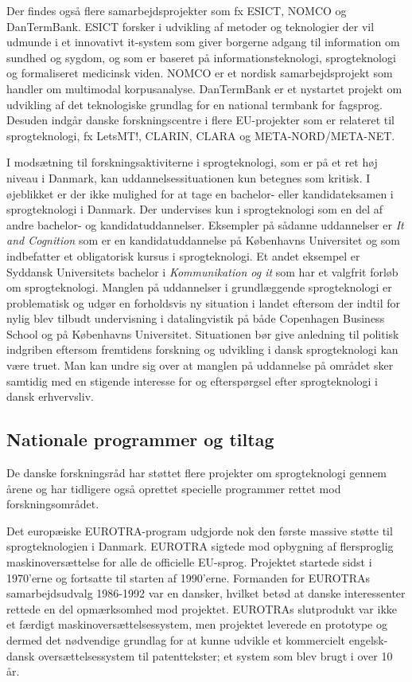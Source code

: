\begin{multicols}{2}
Der findes \mbox{ogs\aa} flere samarbejdsprojekter som fx ESICT, NOMCO og DanTermBank. ESICT forsker i udvikling af metoder og teknologier der vil udmunde i et innovativt it-system som giver borgerne adgang til information om sundhed og sygdom, og som er baseret \mbox{p\aa} informationsteknologi, sprogteknologi og formaliseret medicinsk viden. NOMCO er et nordisk samarbejdsprojekt som handler om multimodal korpusanalyse. DanTermBank er et nystartet projekt om udvikling af det teknologiske grundlag for en national termbank for fag\-sprog. Desuden indg\aa r danske forskningscentre i flere EU-projekter som er relateret til sprogteknologi, fx LetsMT!, CLARIN, CLARA og META-NORD/META-NET.

I mods\ae tning til forskningsaktiviterne i sprogteknologi, som er \mbox{p\aa} et ret h\o j niveau i Danmark, kan uddannelsessituationen kun betegnes som kritisk. I \o jeblikket er der ikke mulighed for at tage en bachelor- eller kandidateksamen i sprogteknologi i Danmark.  Der undervises kun i sprogteknologi som en del af andre bachelor- og kandidatuddannelser. Eksempler \mbox{p\aa} s\aa danne uddannelser er {\it It and Cognition} som er en kandidatuddannelse \mbox{p\aa} K\o benhavns Universitet og som indbefatter et obligatorisk kursus i sprogteknologi. Et andet eksempel er Syddansk Universitets bachelor i {\it Kommunikation og it} som har et valgfrit forl\o b om sprogteknologi. Manglen \mbox{p\aa} uddannelser i grundl\ae ggende sprogteknologi er problematisk og udg\o r en forholdsvis ny situation i landet eftersom der indtil for nylig blev tilbudt undervisning i datalingvistik \mbox{p\aa} b\aa de Copenhagen Business School og \mbox{p\aa} K\o benhavns Universitet. Situationen b\o r give anledning til politisk indgriben eftersom fremtidens forskning og udvikling i dansk sprogteknologi kan v\ae re truet. Man kan undre sig over at manglen \mbox{p\aa} uddannelse \mbox{p\aa} omr\aa det sker samtidig med en stigende interesse for og eftersp\o rgsel efter sprogteknologi i dansk erhvervsliv.

\subsection{Nationale programmer og tiltag}

De danske forskningsr\aa d har st\o ttet flere projekter om sprogteknologi gennem \aa rene og har tidligere \mbox{ogs\aa} oprettet specielle programmer rettet mod forskningsomr\aa det.

Det europ\ae iske EUROTRA-program udgjorde nok den f\o rste massive st\o tte til sprogteknologien i Danmark.  EUROTRA sigtede mod opbygning af flersproglig maskinovers\ae ttelse for alle de officielle EU-sprog. Projektet startede sidst i 1970'erne og fortsatte til starten af 1990'erne. Formanden for EUROTRAs samarbejdsudvalg 1986-1992 var en dansker, hvilket bet\o d at danske interessenter rettede en del opm\ae rksomhed mod projektet. EUROTRAs slutprodukt var ikke et f\ae rdigt maskinovers\ae ttelsessystem, men projektet leverede en prototype og dermed det n\o dvendige grundlag for at kunne udvikle et kommercielt engelsk-dansk overs\ae ttelsessystem til patenttekster; et system som blev brugt i over 10 \aa r.  


\end{multicols}
